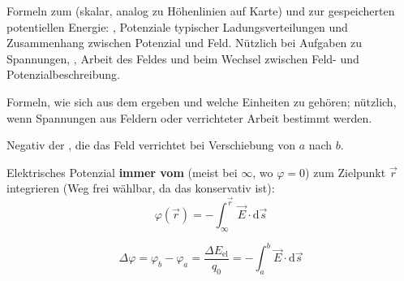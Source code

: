 

\begin{runintext}
Formeln zum  (skalar, analog zu Höhenlinien auf Karte) und zur gespeicherten potentiellen Energie: , Potenziale typischer Ladungsverteilungen und Zusammenhang zwischen Potenzial und Feld. Nützlich bei Aufgaben zu Spannungen, , Arbeit des Feldes und beim Wechsel zwischen Feld- und Potenzialbeschreibung.
\end{runintext}

\begin{runintext}
Formeln, wie sich  aus dem  ergeben und welche Einheiten zu  gehören; nützlich, wenn Spannungen aus Feldern oder verrichteter Arbeit bestimmt werden.
\end{runintext}
\begin{defbox}[Potenzialdifferenz]
Negativ der , die das Feld verrichtet bei Verschiebung von $a$ nach $b$.
\end{defbox}

\begin{warnbox}
Elektrisches Potenzial \textbf{immer vom } (meist bei $\infty$, wo $\varphi=0$) zum Zielpunkt $\vec{r}$ integrieren (Weg frei wählbar, da das  konservativ ist):
\[ \varphi(\vec{r}) = -\int_{\infty}^{\vec{r}} \vec{E}\cdot\mathrm{d}\vec{s} \]
\end{warnbox}

\begin{formulabox}
\[ \Delta\varphi = \varphi_b - \varphi_a = \frac{\Delta E_{\mathrm{el}}}{q_0} = -\int_a^b \vec{E}\cdot\mathrm{d}\vec{s} \]
\end{formulabox}

